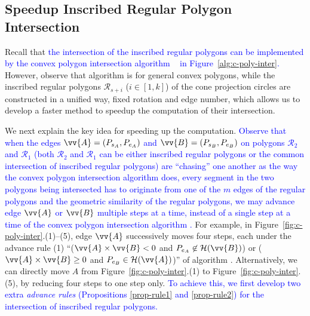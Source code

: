 \subsection{Speedup Inscribed Regular Polygon Intersection}
\label{subsec-fastRPI}

Recall that \textcolor{blue}{the intersection of the inscribed regular polygons can be implemented by the convex polygon intersection algorithm \cpia~\cite{ORourke:Intersection} in Figure~\ref{alg:c-poly-inter}. }
However, observe that algorithm \cpia is for general convex polygons, while the inscribed regular polygons $\mathcal{R}_{s+i}$ ($i\in[1, k]$) of the cone projection circles are constructed in a unified way, \ie fixed rotation and edge number,
which allows us to develop a faster method to speedup the computation of their intersection.

We next explain the key idea for speeding up the computation. \textcolor{blue}{Observe that when the edges $\vv{A} = (P_{s_A}, P_{e_A})$ and $\vv{B} = (P_{s_B}, P_{e_B})$ on polygons $\mathcal{R}_2$ and $\mathcal{R}_1$ (both $\mathcal{R}_2$ and $\mathcal{R}_1$ can be either inscribed regular polygons or the common intersection of inscribed regular polygons) are ``chasing'' one another as the way the convex polygon intersection algorithm \cpia does, every segment in the two polygons being intersected has to originate from one of the $m$ edges of the regular polygons and the geometric similarity of the regular polygons, we may advance edge $\vv{A}$ or $\vv{B}$ multiple steps at a time, instead of a single step at a time of the convex polygon intersection algorithm \cpia.}
%
For example, in Figure~\ref{fig:c-poly-inter}.(1)--(5), edge $\vv{A}$ successively moves four steps, each under the advance rule (1) ``($\vv{A} \times \vv{B} < 0$ and $P_{e_A} \not \in \mathcal{H}(\vv{B})$) or ($\vv{A} \times \vv{B} \ge 0$ and $P_{e_B} \in \mathcal{H}(\vv{A})$)'' of algorithm \cpia.
Alternatively, we can directly move $A$ from Figure~\ref{fig:c-poly-inter}.(1) to Figure~\ref{fig:c-poly-inter}.(5), by reducing four steps to one step only.
\textcolor{blue}{To achieve this, we first develop two extra \emph{advance rules} (Propositions \ref{prop-rule1} and \ref{prop-rule2}) for the intersection of inscribed regular polygons.} 

